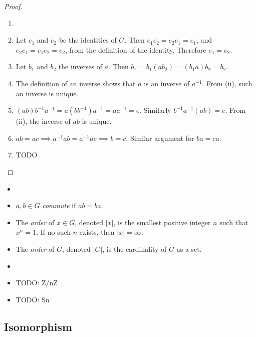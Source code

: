     \begin{proof}
        \begin{enumerate} \item[]
        \item Let $e_1$ and $e_2$ be the identities of $G$. Then $e_1e_2=e_2e_1=e_1$, and $e_2e_1=e_1e_2=e_2$, from the definition of the identity. Therefore $e_1=e_2$.
        \item Let $b_1$ and $b_2$ the inverses of $a$. Then $b_1 = b_1(ab_2) = (b_1a)b_2 = b_2$.
        \item The definition of an inverse shows that $a$ is an inverse of $a^{-1}$. From (ii), such an inverse is unique.
        \item $(ab)b^{-1}a^{-1} = a(bb^{-1})a^{-1} = aa^{-1} = e$. Similarly $b^{-1}a^{-1}(ab) = e$. From (ii), the inverse of $ab$ is unique.
        \item $ab=ac \implies a^{-1}ab=a^{-1}ac \implies b=c$. Similar argument for $ba=ca$.
        \item TODO
        \end{enumerate}
    \end{proof}
    
    \begin{defn} \label{def_group_misc} \begin{itemize}
        \item[]
        \item $a,b \in G$ \emph{commute} if $ab=ba$.
        \item The \emph{order} of $x \in G$, denoted $|x|$, is the smallest positive integer $n$ such that $x^n=1$. If no such $n$ exists, then $|x|=\infty$.
        \item The \emph{order} of $G$, denoted $|G|$, is the cardinality of $G$ as a set.
    \end{itemize} \end{defn}
    
    \begin{defn} \label{def_group_example} \begin{itemize}
        \item[]
        \item TODO: Z/nZ
        \item TODO: Sn
    \end{itemize} \end{defn}
    
    \subsection{Isomorphism}
    
